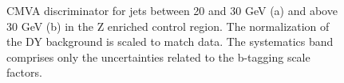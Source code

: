 \begin{figure}
\centering
{}
\caption{CMVA discriminator for jets between 20 and 30 GeV (a) and above 30 GeV (b) in the Z enriched control
region. The normalization of the DY background is scaled to match data. The systematics band comprises only the uncertainties related to the b-tagging scale factors.
}\label{cmvaD}
\end{figure}






